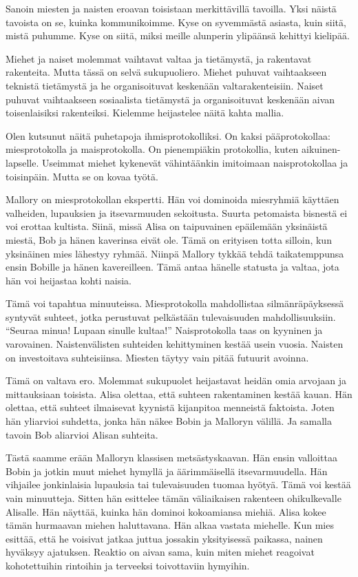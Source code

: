 Sanoin miesten ja naisten eroavan toisistaan merkittävillä tavoilla. Yksi näistä tavoista on se, kuinka kommunikoimme. Kyse on syvemmästä asiasta, kuin siitä, mistä puhumme. Kyse on siitä, miksi meille alunperin ylipäänsä kehittyi kielipää. 

Miehet ja naiset molemmat vaihtavat valtaa ja tietämystä, ja rakentavat rakenteita. Mutta tässä on selvä sukupuoliero. Miehet puhuvat vaihtaakseen teknistä tietämystä ja he organisoituvat keskenään valtarakenteisiin. Naiset puhuvat vaihtaakseen sosiaalista tietämystä ja organisoituvat keskenään aivan toisenlaisiksi rakenteiksi. Kielemme heijastelee näitä kahta mallia.

Olen kutsunut näitä puhetapoja ihmisprotokolliksi. On kaksi pääprotokollaa: miesprotokolla ja maisprotokolla. On pienempiäkin protokollia, kuten aikuinen-lapselle. Useimmat miehet kykenevät vähintäänkin imitoimaan naisprotokollaa ja toisinpäin. Mutta se on kovaa työtä.

Mallory on miesprotokollan ekspertti. Hän voi dominoida miesryhmiä käyttäen valheiden, lupauksien ja itsevarmuuden sekoitusta. Suurta petomaista bisnestä ei voi erottaa kultista. Siinä, missä Alisa on taipuvainen epäilemään yksinäistä miestä, Bob ja hänen kaverinsa eivät ole. Tämä on erityisen totta silloin, kun yksinäinen mies lähestyy ryhmää. Niinpä Mallory tykkää tehdä taikatemppunsa ensin Bobille ja hänen kavereilleen. Tämä antaa hänelle statusta ja valtaa, jota hän voi heijastaa kohti naisia.

Tämä voi tapahtua minuuteissa. Miesprotokolla mahdollistaa silmänräpäyksessä syntyvät suhteet, jotka perustuvat pelkästään tulevaisuuden mahdollisuuksiin. ``Seuraa minua! Lupaan sinulle kultaa!'' Naisprotokolla taas on kyyninen ja varovainen. Naistenvälisten suhteiden kehittyminen kestää usein vuosia. Naisten on investoitava suhteisiinsa. Miesten täytyy vain pitää futuurit avoinna.

Tämä on valtava ero. Molemmat sukupuolet heijastavat heidän omia arvojaan ja mittauksiaan toisista. Alisa olettaa, että suhteen rakentaminen kestää kauan. Hän olettaa, että suhteet ilmaisevat kyynistä kijanpitoa menneistä faktoista. Joten hän yliarvioi suhdetta, jonka hän näkee Bobin ja Malloryn välillä. Ja samalla tavoin Bob aliarvioi Alisan suhteita.

Tästä saamme erään Malloryn klassisen metsästyskaavan. Hän ensin valloittaa Bobin ja jotkin muut miehet hymyllä ja äärimmäisellä itsevarmuudella. Hän vihjailee jonkinlaisia lupauksia tai tulevaisuuden tuomaa hyötyä. Tämä voi kestää vain minuutteja. Sitten hän esittelee tämän väliaikaisen rakenteen ohikulkevalle Alisalle. Hän näyttää, kuinka hän dominoi kokoamiansa miehiä. Alisa kokee tämän hurmaavan miehen haluttavana. Hän alkaa vastata miehelle. Kun mies esittää, että he voisivat jatkaa juttua jossakin yksityisessä paikassa, nainen hyväksyy ajatuksen. Reaktio on aivan sama, kuin miten miehet reagoivat kohotettuihin rintoihin ja terveeksi toivottaviin hymyihin.


